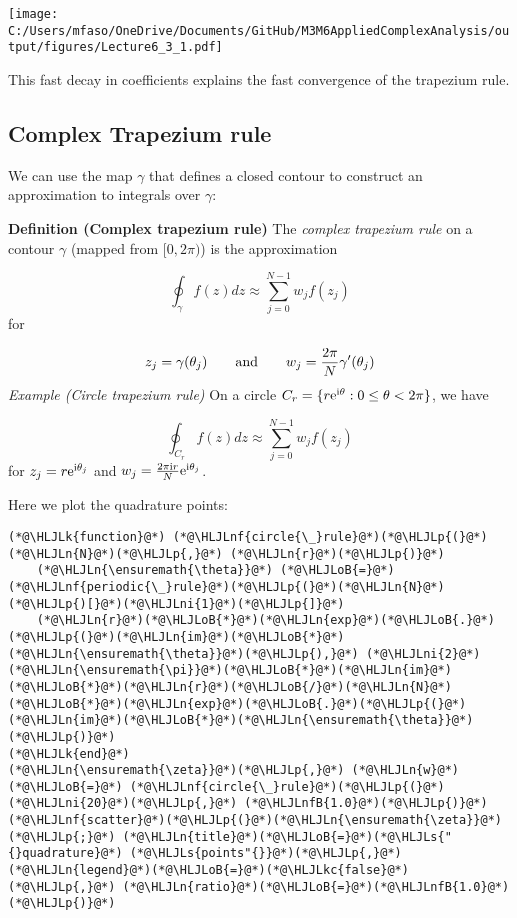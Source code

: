 \documentclass[12pt,a4paper]{article}
\newcommand{\HLJLk}[1]{\textcolor[RGB]{148,91,176}{\textbf{#1}}}
\newcommand{\HLJLkc}[1]{\textcolor[RGB]{59,151,46}{\textit{#1}}}
\newcommand{\HLJLn}[1]{#1}
\newcommand{\HLJLnf}[1]{\textcolor[RGB]{66,102,213}{#1}}
\newcommand{\HLJLs}[1]{\textcolor[RGB]{201,61,57}{#1}}
\newcommand{\HLJLnfB}[1]{\textcolor[RGB]{59,151,46}{#1}}
\newcommand{\HLJLni}[1]{\textcolor[RGB]{59,151,46}{#1}}
\newcommand{\HLJLoB}[1]{\textcolor[RGB]{102,102,102}{\textbf{#1}}}
\newcommand{\HLJLp}[1]{#1}
\def\I{ {\rm i} }
\def\E{ {\rm e} }
\begin{document}
\texttt{[image: C:/Users/mfaso/OneDrive/Documents/GitHub/M3M6AppliedComplexAnalysis/output/figures/Lecture6\_3\_1.pdf]}

This fast decay in coefficients explains the fast convergence of the trapezium rule.

\subsection{Complex Trapezium rule}
We can use the map $\gamma$ that defines a closed contour to construct an approximation to integrals over $\gamma$:

\textbf{Definition (Complex trapezium rule)} The \emph{complex trapezium rule} on a contour $\gamma$ (mapped from $[0,2\pi)$) is the approximation

\[
\oint_\gamma f(z) dz \approx  \sum_{j=0}^{N-1} w_j f(z_j)
\]
for

\[
z_j = \gamma(\theta_j) \qquad\hbox{and}\qquad w_j = {2\pi \over N} \gamma'(\theta_j)
\]
\emph{Example (Circle trapezium rule)} On a circle $C_r = \{r \E^{\I \theta} : 0 \leq \theta < 2 \pi\}$, we have

\[
\oint_{C_r} f(z) dz \approx  \sum_{j=0}^{N-1} w_j f(z_j)
\]
for $z_j = r \E^{\I \theta_j}$ and $w_j = {2 \pi \I r \over N}  \E^{\I \theta_j}$.

Here we plot the quadrature points:


\begin{lstlisting}
(*@\HLJLk{function}@*) (*@\HLJLnf{circle{\_}rule}@*)(*@\HLJLp{(}@*)(*@\HLJLn{N}@*)(*@\HLJLp{,}@*) (*@\HLJLn{r}@*)(*@\HLJLp{)}@*)
    (*@\HLJLn{\ensuremath{\theta}}@*) (*@\HLJLoB{=}@*) (*@\HLJLnf{periodic{\_}rule}@*)(*@\HLJLp{(}@*)(*@\HLJLn{N}@*)(*@\HLJLp{)[}@*)(*@\HLJLni{1}@*)(*@\HLJLp{]}@*)
    (*@\HLJLn{r}@*)(*@\HLJLoB{*}@*)(*@\HLJLn{exp}@*)(*@\HLJLoB{.}@*)(*@\HLJLp{(}@*)(*@\HLJLn{im}@*)(*@\HLJLoB{*}@*)(*@\HLJLn{\ensuremath{\theta}}@*)(*@\HLJLp{),}@*) (*@\HLJLni{2}@*)(*@\HLJLn{\ensuremath{\pi}}@*)(*@\HLJLoB{*}@*)(*@\HLJLn{im}@*)(*@\HLJLoB{*}@*)(*@\HLJLn{r}@*)(*@\HLJLoB{/}@*)(*@\HLJLn{N}@*)(*@\HLJLoB{*}@*)(*@\HLJLn{exp}@*)(*@\HLJLoB{.}@*)(*@\HLJLp{(}@*)(*@\HLJLn{im}@*)(*@\HLJLoB{*}@*)(*@\HLJLn{\ensuremath{\theta}}@*)(*@\HLJLp{)}@*)
(*@\HLJLk{end}@*)
(*@\HLJLn{\ensuremath{\zeta}}@*)(*@\HLJLp{,}@*) (*@\HLJLn{w}@*) (*@\HLJLoB{=}@*) (*@\HLJLnf{circle{\_}rule}@*)(*@\HLJLp{(}@*)(*@\HLJLni{20}@*)(*@\HLJLp{,}@*) (*@\HLJLnfB{1.0}@*)(*@\HLJLp{)}@*)
(*@\HLJLnf{scatter}@*)(*@\HLJLp{(}@*)(*@\HLJLn{\ensuremath{\zeta}}@*)(*@\HLJLp{;}@*) (*@\HLJLn{title}@*)(*@\HLJLoB{=}@*)(*@\HLJLs{"{}quadrature}@*) (*@\HLJLs{points"{}}@*)(*@\HLJLp{,}@*) (*@\HLJLn{legend}@*)(*@\HLJLoB{=}@*)(*@\HLJLkc{false}@*)(*@\HLJLp{,}@*) (*@\HLJLn{ratio}@*)(*@\HLJLoB{=}@*)(*@\HLJLnfB{1.0}@*)(*@\HLJLp{)}@*)
\end{lstlisting}
\end{document}
